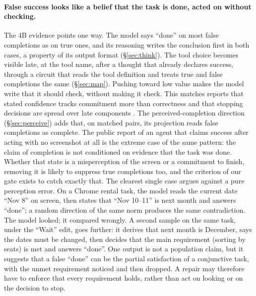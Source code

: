 \paragraph{False success looks like a belief that the task is done, acted on without checking.} The 4B evidence points one way. The model says ``done'' on most false completions as on true ones, and its reasoning writes the conclusion first in both cases, a property of its output format (\S\ref{sec:think}). The tool choice becomes visible late, at the tool name, after a thought that already declares success, through a circuit that reads the tool definition and treats true and false completions the same (\S\ref{sec:map}). Pushing toward low value makes the model write that it should check, without making it check. This matches reports that stated confidence tracks commitment more than correctness \citep{kumaran2026commit} and that stopping decisions are spread over late components \citep{dutta2026termination}. The perceived-completion direction (\S\ref{sec:perceive}) adds that, on \pcMatchN{} matched pairs, its projection reads false completions as complete. The public report of an agent that claims success after acting with no screenshot at all \citep{holodesktop2026issue15} is the extreme case of the same pattern: the claim of completion is not conditioned on evidence that the task was done. Whether that state is a misperception of the screen or a commitment to finish, removing it is likely to suppress true completions too, and the \fsm{} criterion of our gate exists to catch exactly that. The clearest single case argues against a pure perception error. On a Chrome rental task, the model reads the current date ``Nov 8'' on screen, then states that ``Nov 10--11'' is next month and answers ``done''; a random direction of the same norm produces the same contradiction. %
The model looked; it compared wrongly. A second sample on the same task, under the ``Wait'' edit, goes further: it derives that next month is December, says the dates must be changed, then decides that the main requirement (sorting by seats) is met and answers ``done''. %
One output is not a population claim, but it suggests that a false ``done'' can be the partial satisfaction of a conjunctive task, with the unmet requirement noticed and then dropped. A repair may therefore have to enforce that every requirement holds, rather than act on looking or on the decision to stop.


